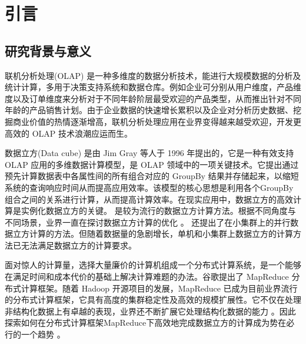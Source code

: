 \chapter{引言}

\section{研究背景与意义}
联机分析处理(OLAP) \cite{chaudhuri1997overview} 是一种多维度的数据分析技术，能进行大规模数据的分析及统计计算，多用于决策支持系统和数据仓库。例如企业可分别从用户维度，产品维度以及订单维度来分析对于不同年龄阶层最受欢迎的产品类型，从而推出针对不同年龄的产品销售计划。由于企业数据的快速增长累积以及企业对分析历史数据、挖掘商业价值的热情逐渐增高，联机分析处理应用在业界变得越来越受欢迎，开发更高效的 OLAP 技术浪潮应运而生。

数据立方(Data cube) \cite{gray1997data}是由 Jim Gray 等人于 1996 年提出的，它是一种有效支持 OLAP 应用的多维数据计算模型，是 OLAP 领域中的一项关键技术。它提出通过预先计算数据表中各属性间的所有组合对应的 GroupBy 结果并存储起来，以缩短系统的查询响应时间从而提高应用效率。该模型的核心思想是利用各个GroupBy组合之间的关系进行计算，从而提高计算效率。在现实应用中，数据立方的高效计算是实例化数据立方的关键。 \cite{agarwal1996computation} \cite{beyer1999bottom} 是较为流行的数据立方计算方法。根据不同角度与不同场景，业界一直在探讨数据立方计算的优化 \cite{xin2003star} \cite{harinarayan1996implementing} \cite{zhao1997array} \cite{han2001efficient} \cite{wang2002condensed}。\cite{ng2001iceberg} \cite{dehne2002parallelizing} 还提出了在小集群上的并行数据立方计算的方法。但随着数据量的急剧增长，单机和小集群上数据立方的计算方法已无法满足数据立方的计算要求。


面对惊人的计算量，选择大量廉价的计算机组成一个分布式计算系统，是一个能够在满足时间和成本代价的基础上解决计算难题的办法。谷歌提出了 MapReduce \cite{dean2008mapreduce}分布式计算框架。随着 Hadoop \cite{hadoop}开源项目的发展，MapReduce 已成为目前业界流行的分布式计算框架，它具有高度的集群稳定性及高效的规模扩展性。它不仅在处理非结构化数据上有卓越的表现，业界还不断扩展它处理结构化数据的能力 \cite{hbase} \cite{abouzeid2009hadoopdb} \cite{buck2011scihadoop} \cite{pig} \cite{hive}。因此探索如何在分布式计算框架MapReduce下高效地完成数据立方的计算成为势在必行的一个趋势
 \cite{abello2011building} \cite{wang2010mapreducemerge} \cite{sergey2009applying} \cite{lee2012efficient} \cite{wang2013scalable}。




